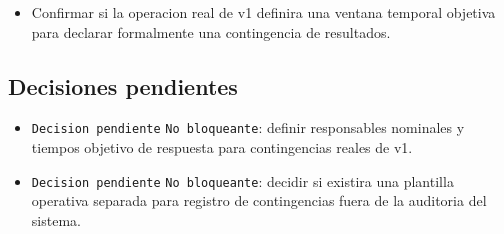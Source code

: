 \begin{itemize}
  \item Confirmar si la operacion real de v1 definira una ventana temporal objetiva para declarar formalmente una contingencia de resultados.
\end{itemize}

\subsection{Decisiones pendientes}

\begin{itemize}
  \item \texttt{Decision pendiente} \texttt{No bloqueante}: definir responsables nominales y tiempos objetivo de respuesta para contingencias reales de v1.
  \item \texttt{Decision pendiente} \texttt{No bloqueante}: decidir si existira una plantilla operativa separada para registro de contingencias fuera de la auditoria del sistema.
\end{itemize}
